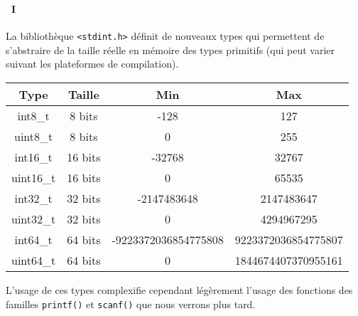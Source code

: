 \begin{frame}[containsverbatim]
  \frametitle{\secname}
  \framesubtitle{\subsecname~I}

  La bibliothèque \verb|<stdint.h>| définit de nouveaux types qui permettent de s'abstraire de la taille 
  réelle en mémoire des types primitifs (qui peut varier suivant les plateformes de compilation).
  \begin{center}
    {\footnotesize\begin{tabular}{|c|c|c|c|}
      \hline
      Type & Taille & Min & Max \\
      \hline
      int8\_t & 8 bits & -128 & 127 \\
      \hline
      uint8\_t & 8 bits & 0 & 255 \\
      \hline
      int16\_t & 16 bits & -32768 & 32767 \\
      \hline
      uint16\_t & 16 bits & 0 & 65535 \\
      \hline
      int32\_t & 32 bits & -2147483648 & 2147483647 \\
      \hline
      uint32\_t & 32 bits & 0 & 4294967295 \\
          \hline
      int64\_t & 64 bits & -9223372036854775808 & 9223372036854775807 \\
      \hline
      uint64\_t & 64 bits & 0 & 1844674407370955161 \\
      \hline
    \end{tabular}}
  \end{center}
  \vspace{0.3cm}
  \par
  L'usage de ces types complexifie cependant légèrement l'usage des fonctions des familles \verb|printf()| et \verb|scanf()| que
  nous verrons plus tard.  
\end{frame}

